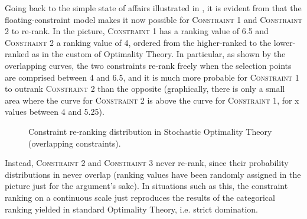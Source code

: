 Going back to the simple state of affairs illustrated in , it is evident from  that the floating-constraint model makes it now possible for \textsc{Constraint 1} and \textsc{Constraint 2} to re-rank. In the picture, \textsc{Constraint 1} has a ranking value of 6.5 and \textsc{Constraint 2} a ranking value of 4, ordered from the higher-ranked to the lower-ranked as in the custom of Optimality Theory. In particular, as shown by the overlapping curves, the two constraints re-rank freely when the selection points are comprised between 4 and 6.5, and it is much more probable for \textsc{Constraint 1} to outrank \textsc{Constraint 2} than the opposite (graphically, there is only a small area where the curve for \textsc{Constraint 2} is above the curve for \textsc{Constraint 1}, for x values between 4 and 5.25).


\begin{figure}[htb]
\caption{Constraint re-ranking distribution in Stochastic Optimality Theory (overlapping constraints).}
\end{figure}

Instead, \textsc{Constraint 2} and \textsc{Constraint 3} never re-rank, since their probability distributions in  never overlap (ranking values have been randomly assigned in the picture just for the argument's sake). In situations such as this, the constraint ranking on a continuous scale just reproduces the results of the categorical ranking yielded in standard Optimality Theory, i.e. strict domination.


